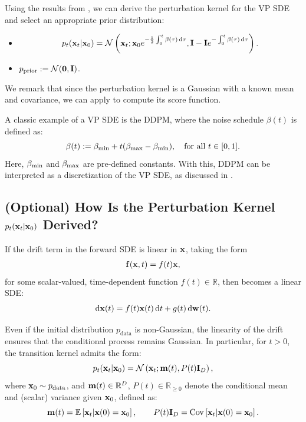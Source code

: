 Using the results from , we can derive the perturbation kernel for the VP SDE and select an appropriate prior distribution:
\begin{itemize}
    \item {}
    \[
    p_t({\mathbf{x}}_t|{\mathbf{x}}_0) = \mathcal{N}\left({\mathbf{x}}_t ; {\mathbf{x}}_0 e^{-\frac{1}{2}\int_{0}^{t} \beta(\tau)\mathop{}\!\mathrm{d} \tau}, {\mathbf{I}} - {\mathbf{I}} e^{-\int_{0}^{t} \beta(\tau)\mathop{}\!\mathrm{d} \tau}\right).
    \]
    \item {} $p_{\mathrm{prior}} := \mathcal{N}(\bm{0}, {\mathbf{I}})$.
\end{itemize}
We remark that since the perturbation kernel is a Gaussian with a known mean and covariance, we can apply  to compute its score function.

A classic example of a VP SDE is the DDPM, where the noise schedule $\beta(t)$ is defined as:
\[
\beta(t) := \beta_{\textup{min}} + t(\beta_{\textup{max}} - \beta_{\textup{min}}), \quad \text{for all } t \in [0,1].
\]
Here, $\beta_{\textup{min}}$ and $\beta_{\textup{max}}$ are pre-defined constants. With this, DDPM can be interpreted as a discretization of the VP SDE, as discussed in .






\subsection{(Optional) How Is the Perturbation Kernel 
$ p_t({\mathbf{x}}_t|{\mathbf{x}}_0) $ Derived?}\label{subsec:scoresde-perturbation-kernel}
If the drift term in the forward SDE  is linear in ${\mathbf{x}}$, taking the form
\begin{align*}
    {\mathbf{f}}({\mathbf{x}}, t) = f(t) {\mathbf{x}},
\end{align*}
for some scalar-valued, time-dependent function $f(t) \in \mathbb{R}$, then  becomes a linear SDE:
\[
\mathop{}\!\mathrm{d}{\mathbf{x}}(t) = f(t){\mathbf{x}}(t) \mathop{}\!\mathrm{d} t + g(t) \mathop{}\!\mathrm{d}{\mathbf{w}}(t).
\]


Even if the initial distribution $p_{\mathrm{data}}$ is non-Gaussian, the linearity of the drift ensures that the conditional process remains Gaussian. In particular, for $t>0$, the transition kernel admits the form:
\[
p_t( {\mathbf{x}}_t | {\mathbf{x}}_0 ) = \mathcal{N} \left( {\mathbf{x}}_t;  {\mathbf{m}}(t),  P(t) \mathbf{I}_D \right),
\]
where ${\mathbf{x}}_0 \sim p_{\mathrm{data}}$, and ${\mathbf{m}}(t) \in \mathbb{R}^D$, $P(t)\in\mathbb{R}_{\ge 0}$ denote the conditional mean and (scalar) variance given ${\mathbf{x}}_0$, defined as:
\[
{\mathbf{m}}(t) = \mathbb{E} \left[{\mathbf{x}}_t | {\mathbf{x}}(0) = {\mathbf{x}}_0\right], \qquad
P(t) \mathbf{I}_D = \operatorname{Cov} \left[{\mathbf{x}}_t | {\mathbf{x}}(0) = {\mathbf{x}}_0\right].
\]

